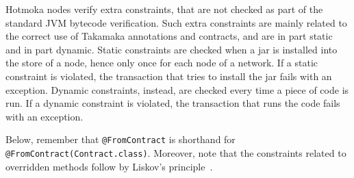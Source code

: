 Hotmoka nodes verify extra constraints, that are not checked as part of the
standard JVM bytecode verification. Such extra constraints are mainly related to
the correct use of Takamaka annotations and contracts, and are
in part static and in part dynamic. Static constraints are checked when a
jar is installed into the store of a node, hence only once for each node of a network.
If a static constraint
is violated, the transaction that tries to install the jar fails with
an exception. Dynamic constraints, instead,
are checked every time a piece of code is run. If a dynamic constraint is
violated, the transaction that runs the code fails with an exception.

Below, remember that \texttt{@FromContract} is shorthand for \texttt{@FromContract(Contract.class)}.
Moreover, note that the constraints related
to overridden methods follow by Liskov's principle~\cite{LiskovW94}.

